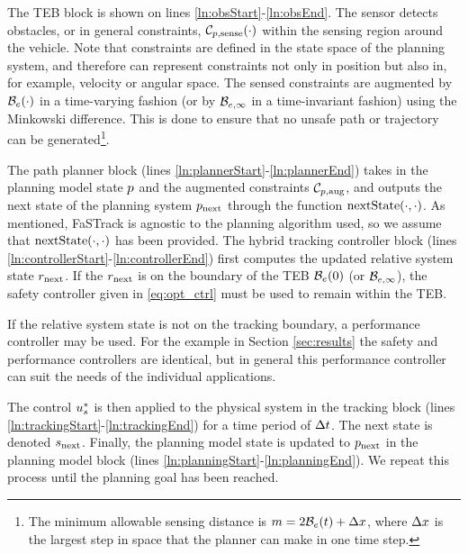 The TEB block is shown on lines \ref{ln:obsStart}-\ref{ln:obsEnd}. 
The sensor detects obstacles, or in general constraints, $\mathcal C_{p,\text{sense}}(\cdot)$ within the sensing region around the vehicle.
Note that constraints are defined in the state space of the planning system, and therefore can represent constraints not only in position but also in, for example, velocity or angular space.
The sensed constraints are augmented by $\mathcal B_e(\cdot)$ in a time-varying fashion (or by $\mathcal B_{e, \infty}$ in a time-invariant fashion) using the Minkowski difference. 
This is done to ensure that no unsafe path or trajectory can be generated\footnote{The minimum allowable sensing distance is $m = 2\mathcal B_e(t) + \Delta x$, where $\Delta x$ is the largest step in space that the planner can make in one time step.}.

The path planner block (lines \ref{ln:plannerStart}-\ref{ln:plannerEnd}) takes in the planning model state $p$ and the augmented constraints $\mathcal C_{p,\text{aug}}$, and outputs the next state of the planning system $p_\text{next}$ through the function $\text{nextState}(\cdot, \cdot)$.
As mentioned, FaSTrack is agnostic to the planning algorithm used, so we assume that $\text{nextState}(\cdot, \cdot)$ has been provided.
The hybrid tracking controller block (lines \ref{ln:controllerStart}-\ref{ln:controllerEnd}) first computes the updated relative system state $r_\text{next}$. 
If the $r_\text{next}$ is on the boundary of the TEB $\mathcal B_e(0)$ (or $\mathcal B_{e, \infty}$), the safety controller given in \eqref{eq:opt_ctrl} must be used to remain within the TEB. 

If the relative system state is not on the tracking boundary, a performance controller may be used. For the example in Section \ref{sec:results} the safety and performance controllers are identical, but in general this performance controller can suit the needs of the individual applications.

The control $u_s^*$ is then applied to the physical system in the tracking block (lines \ref{ln:trackingStart}-\ref{ln:trackingEnd}) for a time period of $\Delta t$. 
The next state is denoted $s_\text{next}$. 
Finally, the planning model state is updated to $p_\text{next}$ in the planning model block (lines \ref{ln:planningStart}-\ref{ln:planningEnd}). 
We repeat this process until the planning goal has been reached.